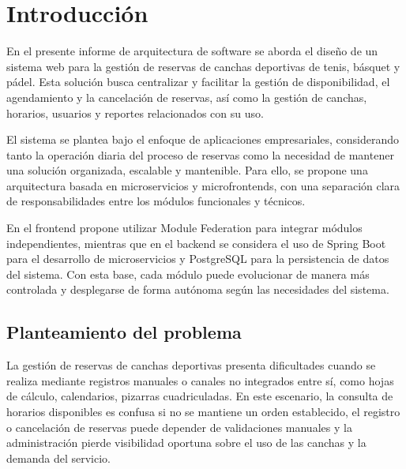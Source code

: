 
\section{Introducción}
\label{sec:introduccion}

En el presente informe de arquitectura de software se aborda el diseño de un sistema web para la gestión de reservas
de canchas deportivas de tenis, básquet y pádel. Esta solución busca centralizar y facilitar la gestión de disponibilidad,
el agendamiento y la cancelación de reservas, así como la gestión de canchas, horarios, usuarios y reportes relacionados
con su uso.

El sistema se plantea bajo el enfoque de aplicaciones empresariales, considerando tanto la operación diaria del proceso de
reservas como la necesidad de mantener una solución organizada, escalable y mantenible. Para ello, se propone una arquitectura
basada en microservicios y microfrontends, con una separación clara de responsabilidades entre los módulos funcionales y
técnicos.

En el frontend propone utilizar Module Federation para integrar módulos independientes, mientras que en el backend se considera el uso de
Spring Boot para el desarrollo de microservicios y PostgreSQL para la persistencia de datos del sistema. Con esta base, cada módulo
puede evolucionar de manera más controlada y desplegarse de forma autónoma según las necesidades del sistema.

\subsection{Planteamiento del problema}
\label{sec:problema}


La gestión de reservas de canchas deportivas presenta dificultades cuando se realiza mediante registros manuales o 
canales no integrados entre sí, como hojas de cálculo, calendarios, pizarras cuadriculadas. En este escenario, la consulta 
de horarios disponibles es confusa si no se mantiene un orden establecido, el registro o cancelación de reservas puede 
depender de validaciones manuales y la administración pierde visibilidad oportuna sobre el uso de las canchas y la demanda del servicio.

